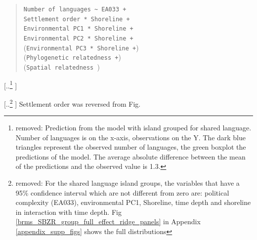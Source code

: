 \documentclass[unnumsec,webpdf,modern,medium]{oup-authoring-template}
\providecommand{\DIFaddtex}[1]{{\protect\color{blue} \sf #1}} %
\providecommand{\DIFdeltex}[1]{{\protect\color{red} [..\footnote{removed: #1} ]}} %
\providecommand{\DIFaddbegin}{} %
\providecommand{\DIFaddend}{} %
\providecommand{\DIFdelbegin}{} %
\providecommand{\DIFdelend}{} %
\providecommand{\DIFdelFL}[1]{\DIFdel{#1}} %
\providecommand{\DIFadd}[1]{\texorpdfstring{\DIFaddtex{#1}}{#1}} %
\providecommand{\DIFdel}[1]{\texorpdfstring{\DIFdeltex{#1}}{}} %
\newcommand{\DIFscaledelfig}{0.5}
\newlength{\DIFdelgraphicswidth} %
\newlength{\DIFdelgraphicsheight} %
\newcommand{\DIFaddincludegraphics}[2][]{{\color{blue}\fbox{\DIFOincludegraphics[#1]{#2}}}} %
\newcommand{\DIFdelincludegraphics}[2][]{%
\sbox{\DIFdelgraphicsbox}{\DIFOincludegraphics[#1]{#2}}%
\settoboxwidth{\DIFdelgraphicswidth}{\DIFdelgraphicsbox} %
\settoboxtotalheight{\DIFdelgraphicsheight}{\DIFdelgraphicsbox} %
\scalebox{\DIFscaledelfig}{%
\parbox[b]{\DIFdelgraphicswidth}{\usebox{\DIFdelgraphicsbox}\\[-\baselineskip] \rule{\DIFdelgraphicswidth}{0em}}\llap{\resizebox{\DIFdelgraphicswidth}{\DIFdelgraphicsheight}{%
\setlength{\unitlength}{\DIFdelgraphicswidth}%
\begin{picture}(1,1)%
\thicklines\linethickness{2pt} %
{\color[rgb]{1,0,0}\put(0,0){\framebox(1,1){}}}%
{\color[rgb]{1,0,0}\put(0,0){\line( 1,1){1}}}%
{\color[rgb]{1,0,0}\put(0,1){\line(1,-1){1}}}%
\end{picture}%
}\hspace*{3pt}}} %
} %
\DeclareRobustCommand{\DIFaddbegin}{\DIFOaddbegin \let\includegraphics\DIFaddincludegraphics} %
\DeclareRobustCommand{\DIFaddend}{\DIFOaddend \let\includegraphics\DIFOincludegraphics} %
\DeclareRobustCommand{\DIFdelbegin}{\DIFOdelbegin \let\includegraphics\DIFdelincludegraphics} %
\DeclareRobustCommand{\DIFdelend}{\DIFOaddend \let\includegraphics\DIFOincludegraphics} %
\begin{document}
\DIFaddbegin \begin{quotation}
\DIFadd{\texttt{Number of languages \textasciitilde{} EA033 +} }\\
\indent \indent\DIFadd{\texttt{Settlement order *  Shoreline +} }\\
\indent \indent \DIFadd{\texttt{Environmental PC1  *  Shoreline +} }\\
\indent \indent\DIFadd{\texttt{Environmental PC2  *  Shoreline +} }\\
\indent \indent \DIFadd{(\texttt{Environmental PC3 *  Shoreline +}) }\\
\indent \indent \DIFadd{(\texttt{Phylogenetic relatedness +}) }\\
\indent \indent \DIFadd{(\texttt{Spatial relatedness }) }\\
\end{quotation}
\DIFaddend 

\DIFdelbegin %
{%
\DIFdelFL{Prediction from the model with island grouped for shared language. Number of languages is on the x-axis, observations on the Y. The dark blue triangles represent the observed number of languages, the green boxplot the predictions of the model. The average absolute difference between the mean of the predictions and the observed value is 1.3.}}

\DIFdel{For the shared language island groups, the variables that have a 95\% confidence interval which are not different from zero are: political complexity (EA033), environmental PC1, Shoreline, time depth and shoreline in interaction with time depth. Fig \ref{brms_SBZR_group_full_effect_ridge_panels} in Appendix \ref{appendix_supp_figs} shows the full distributions}\DIFdelend \DIFaddbegin \DIFadd{Settlement order was reversed from Fig}\DIFaddend . \DIFdelbegin %
\end{document}
